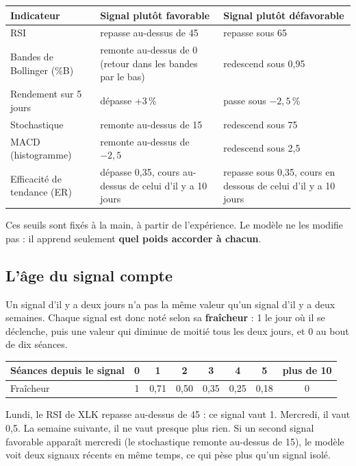 \documentclass[11pt,a4paper]{article}
\begin{document}
\begin{center}
\small
\begin{tabularx}{\linewidth}{@{}l >{\raggedright\arraybackslash}X >{\raggedright\arraybackslash}X@{}}
\toprule
\textbf{Indicateur} & \textbf{Signal plutôt favorable} & \textbf{Signal plutôt défavorable} \\
\midrule
RSI                     & repasse au-dessus de 45 & repasse sous 65 \\
Bandes de Bollinger (\%B) & remonte au-dessus de 0 (retour dans les bandes par le bas) & redescend sous 0,95 \\
Rendement sur 5 jours   & dépasse +3\,\% & passe sous $-2{,}5$\,\% \\
Stochastique            & remonte au-dessus de 15 & redescend sous 75 \\
MACD (histogramme)      & remonte au-dessus de $-2{,}5$ & redescend sous 2,5 \\
Efficacité de tendance (ER) & dépasse 0,35, cours au-dessus de celui d'il y a 10 jours & repasse sous 0,35, cours en dessous de celui d'il y a 10 jours \\
\bottomrule
\end{tabularx}
\end{center}

Ces seuils sont fixés à la main, à partir de l'expérience. Le modèle ne les modifie pas :
il apprend seulement \textbf{quel poids accorder à chacun}.

\subsection{L'âge du signal compte}
Un signal d'il y a deux jours n'a pas la même valeur qu'un signal d'il y a deux semaines.
Chaque signal est donc noté selon sa \textbf{fraîcheur} : 1 le jour où il se déclenche, puis
une valeur qui diminue de moitié tous les deux jours, et 0 au bout de dix séances.

\begin{center}
\small
\begin{tabular}{lccccccc}
\toprule
Séances depuis le signal & 0 & 1 & 2 & 3 & 4 & 5 & plus de 10 \\
\midrule
Fraîcheur & 1 & 0,71 & 0,50 & 0,35 & 0,25 & 0,18 & 0 \\
\bottomrule
\end{tabular}
\end{center}

\begin{exemple}
Lundi, le RSI de XLK repasse au-dessus de 45 : ce signal vaut 1. Mercredi, il vaut 0,5.
La semaine suivante, il ne vaut presque plus rien. Si un second signal favorable apparaît
mercredi (le stochastique remonte au-dessus de 15), le modèle voit deux signaux récents en
même temps, ce qui pèse plus qu'un signal isolé.
\end{exemple}
\end{document}
